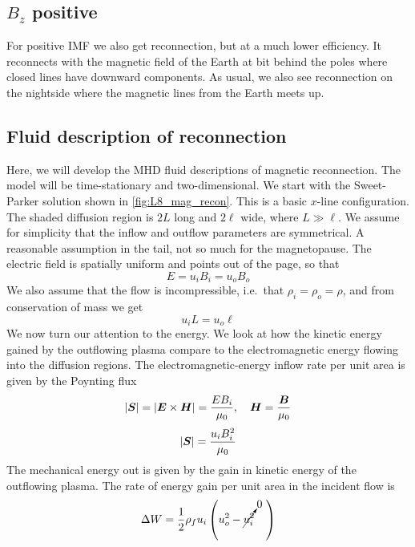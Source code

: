 \subsection{\(B_z\) positive}
For positive IMF we also get reconnection, but at a much lower efficiency. It reconnects with the magnetic field of the Earth at bit behind the poles where closed lines have downward components. As usual, we also see reconnection on the nightside where the magnetic lines from the Earth meets up.

\subsection{Fluid description of reconnection}
Here, we will develop the MHD fluid descriptions of magnetic reconnection. The model will be time-stationary and two-dimensional. We start with the Sweet-Parker solution shown in \cref{fig:L8_mag_recon}. This is a basic \(x\)-line configuration. The shaded diffusion region is \(2L\) long and \(2\ell \) wide, where \(L\gg\ell \). We assume for simplicity that the inflow and outflow parameters are symmetrical. A reasonable assumption in the tail, not so much for the magnetopause. The electric field is spatially uniform and points out of the page, so that
\begin{equation*}
    E=u_{i}B_i=u_{o}B_o
\end{equation*}
We also assume that the flow is incompressible, i.e.\ that \(\rho_i=\rho_o=\rho \), and from conservation of mass we get
\begin{equation}\label{eq:L8_ell_relation_L}
    u_{i}L=u_o\ell
\end{equation}
We now turn our attention to the energy. We look at how the kinetic energy gained by the outflowing plasma compare to the electromagnetic energy flowing into the diffusion regions. The electromagnetic-energy inflow rate per unit area is given by the Poynting flux
\begin{equation*}
    |\boldsymbol{S}|=|\boldsymbol{E}\times\boldsymbol{H}|=\frac{EB_i}{\mu_0},\quad\boldsymbol{H}=\frac{\boldsymbol{B}}{\mu_0}
\end{equation*}
\begin{equation*}
    |\boldsymbol{S}|=\frac{u_{i}B_i^2}{\mu_0}
\end{equation*}
The mechanical energy out is given by the gain in kinetic energy of the outflowing plasma. The rate of energy gain per unit area in the incident flow is
\begin{equation*}
    \Delta W=\frac{1}{2}\rho_f u_i\left(u_o^2-\cancelto{0}{u_i^2}~~~\right)
\end{equation*}
